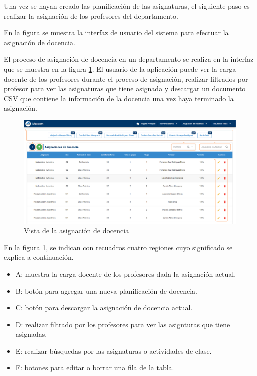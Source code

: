 Una vez se hayan creado las planificación de las asignaturas, el siguiente paso 
es realizar la asignación de los profesores del departamento.



En la figura 
se muestra la interfaz de usuario del sistema para efectuar la asignación de docencia.



El proceso de asignación de docencia en un departamento se realiza en la 
interfaz que se muestra en la figura \ref{img-ta-done}. El usuario de la 
aplicación puede ver la carga docente de los profesores durante el proceso 
de asignación, realizar filtrados por profesor para ver las asignaturas 
que tiene asignada y descargar un documento CSV que contiene la información 
de la docencia una vez haya terminado la asignación.


\begin{figure}[H]
    \includegraphics[scale=0.3]{Graphics/Implementation/Docencia/AD-asignada.png}
    \caption{Vista de la asignación de docencia}
    \label{img-ta-done}
\end{figure}

En la figura \ref{img-ta-done},
se indican con recuadros cuatro regiones cuyo significado se explica a continuación.

\begin{itemize}
    \item A: muestra la carga docente de los profesores dada la asignación actual.
    \item B: botón para agregar una nueva planificación de docencia.
    \item C: botón para descargar la asignación de docencia actual.
    \item D: realizar filtrado por los profesores para ver las asignturas que tiene asignadas.
    \item E: realizar búsquedas por las asignaturas o actividades de clase.
    \item F: botones para editar o borrar una fila de la tabla.  
\end{itemize}



